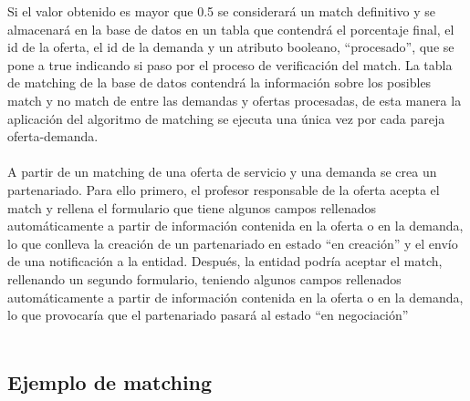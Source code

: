 \documentclass[11pt]{article}
\begin{document}
Si el valor obtenido es mayor que 0.5 se considerará un match definitivo y se almacenará en la base de datos en un tabla que contendrá el porcentaje final, el id de la oferta, el id de la demanda y un atributo booleano, “procesado”, que se pone a true indicando si paso por el proceso de verificación del match. La tabla de matching de la base de datos contendrá la información sobre los posibles match y no match de entre las demandas y ofertas procesadas, de esta manera la aplicación del algoritmo de matching se ejecuta una única vez por cada pareja oferta-demanda. \\\\

A partir de un matching de una oferta de servicio y una demanda se crea un partenariado. Para ello primero, el profesor responsable de la oferta acepta el match y rellena el formulario que tiene  algunos campos rellenados automáticamente a partir de información contenida en la oferta o en la demanda, lo que conlleva la creación de un partenariado en estado “en creación” y el envío de una notificación a la entidad. Después, la entidad podría aceptar el match, rellenando un segundo formulario, teniendo algunos campos rellenados automáticamente a partir de información contenida en la oferta o en la demanda, lo que provocaría que el partenariado pasará al estado “en negociación” \\\\

\subsection{Ejemplo de matching}
\end{document}
